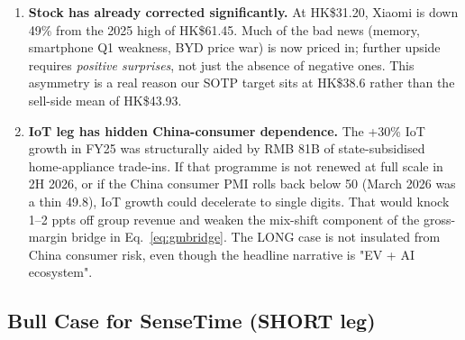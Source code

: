 \documentclass[11pt,a4paper]{article}
\begin{document}
\begin{enumerate}
\item \textbf{Stock has already corrected significantly.} At HK\$31.20, Xiaomi is down 49\% from the 2025 high of HK\$61.45. Much of the bad news (memory, smartphone Q1 weakness, BYD price war) is now priced in; further upside requires \textit{positive surprises}, not just the absence of negative ones. This asymmetry is a real reason our SOTP target sits at HK\$38.6 rather than the sell-side mean of HK\$43.93.
\item \textbf{IoT leg has hidden China-consumer dependence.} The +30\% IoT growth in FY25 was structurally aided by RMB 81B of state-subsidised home-appliance trade-ins. If that programme is not renewed at full scale in 2H 2026, or if the China consumer PMI rolls back below 50 (March 2026 was a thin 49.8), IoT growth could decelerate to single digits. That would knock 1--2 ppts off group revenue and weaken the mix-shift component of the gross-margin bridge in Eq.\ \ref{eq:gmbridge}. The LONG case is not insulated from China consumer risk, even though the headline narrative is "EV + AI ecosystem".
\end{enumerate}

\subsection{Bull Case for SenseTime (SHORT leg)}
\end{document}
